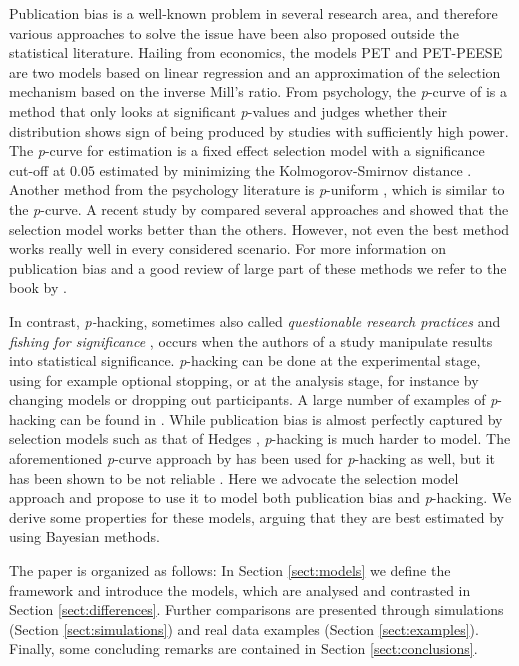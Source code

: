\documentclass{article}
\theoremstyle{plain}
\theoremstyle{definition}
\begin{document}
Publication bias is a well-known problem in several research area, and therefore various approaches to solve the issue have been also proposed outside the statistical literature. Hailing from economics, the models PET and PET-PEESE \citep{stanley2014meta,stanley2017limitations} are two models based on linear regression and an approximation of the selection mechanism based on the inverse Mill's ratio. From psychology, the \emph{p}-curve of \citet{simonsohn2014p} is a method that only looks at significant \emph{p}-values and judges whether their distribution shows sign of being produced by studies with sufficiently high power. The \emph{p}-curve for estimation \citep{simonsohn2014} is a fixed effect selection model with a significance cut-off at $0.05$ estimated by minimizing the Kolmogorov-Smirnov distance \citep{mcshane2016adjusting}. Another method from the psychology literature is \emph{p}-uniform \citep{van2015meta}, which is similar to the \emph{p}-curve. A recent study by \citet{carter2019correcting} compared several approaches and showed that the selection model works better than the others. However, not even the best method works really well in every considered scenario. For more information on publication bias and a good review of large part of these methods we refer to the book by \citet{rothstein2006publication}.

In contrast, \emph{p-}hacking, sometimes also called \emph{questionable research practices} \citep{Sijtsma2016} and \emph{fishing for significance} \citep{Boulesteix2009}, occurs when the authors of a study manipulate results into statistical significance. \textit{p}-hacking can be done at the experimental stage, using for example optional stopping, or at the analysis stage, for instance by changing models or dropping out participants. A large number of examples of \textit{p}-hacking can be found in \citet{simmons2011false}. While publication bias is almost perfectly captured by selection models such as that of Hedges \citeyearpar{hedges1992modeling}, \textit{p}-hacking is much harder to model. The aforementioned \emph{p}-curve approach by \citet{simonsohn2014p} has been used for \textit{p}-hacking as well, but it has been shown to be not reliable \citep{BrunsIoannidis2016}. Here we advocate the selection model approach and propose to use it to model both publication bias and \textit{p}-hacking. We derive some properties for these models, arguing that they are best estimated by using Bayesian methods. 

The paper is organized as follows: In Section \ref{sect:models} we define the framework and introduce the models, which are analysed and contrasted in Section \ref{sect:differences}. Further comparisons are presented through simulations (Section \ref{sect:simulations}) and real data examples (Section \ref{sect:examples}). Finally, some concluding remarks are contained in Section \ref{sect:conclusions}.
\end{document}
